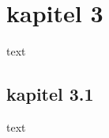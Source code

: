 \section{kapitel 3}
\label{sec:kapitel3}

text

\subsection{kapitel 3.1}
\label{sec:kapitel31}

text